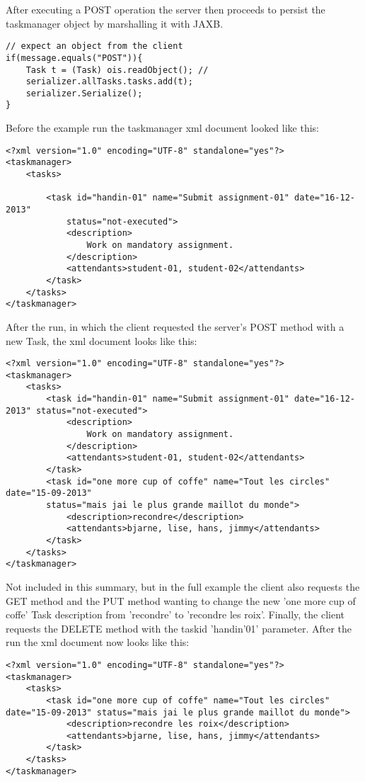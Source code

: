 After executing a POST operation the server then proceeds to persist the taskmanager object by marshalling it with JAXB.

\begin{lstlisting}[caption=server POST]
// expect an object from the client
if(message.equals("POST")){   
	Task t = (Task) ois.readObject(); // 
	serializer.allTasks.tasks.add(t);
    serializer.Serialize();	
}
\end{lstlisting}

Before the example run the taskmanager xml document looked like this:

\begin{lstlisting}[caption=xml before run]
<?xml version="1.0" encoding="UTF-8" standalone="yes"?>
<taskmanager>
	<tasks>
		
		<task id="handin-01" name="Submit assignment-01" date="16-12-2013"
			status="not-executed">
			<description>
				Work on mandatory assignment.
			</description>
			<attendants>student-01, student-02</attendants>
		</task>	
	</tasks>
</taskmanager>

\end{lstlisting}

After the run, in which the client requested the server's POST method with a new Task, the xml document looks like this:

\begin{lstlisting}[caption=xml after POST]
<?xml version="1.0" encoding="UTF-8" standalone="yes"?>
<taskmanager>
	<tasks>
		<task id="handin-01" name="Submit assignment-01" date="16-12-2013" status="not-executed">
			<description>
				Work on mandatory assignment.
			</description>
			<attendants>student-01, student-02</attendants>
		</task>
		<task id="one more cup of coffe" name="Tout les circles" date="15-09-2013" 
		status="mais jai le plus grande maillot du monde">
			<description>recondre</description>
			<attendants>bjarne, lise, hans, jimmy</attendants>
		</task>
	</tasks>
</taskmanager>
\end{lstlisting}

Not included in this summary, but in the full example the client also requests the GET method and the PUT method wanting to change the new 'one more cup of coffe' Task description from 'recondre' to 'recondre les roix'. Finally, the client requests the DELETE method with the taskid 'handin'01' parameter. After the run the xml document now looks like this:

\begin{lstlisting}[caption=xml after PUT]
<?xml version="1.0" encoding="UTF-8" standalone="yes"?>
<taskmanager>
	<tasks>
		<task id="one more cup of coffe" name="Tout les circles" date="15-09-2013" status="mais jai le plus grande maillot du monde">
			<description>recondre les roix</description>
			<attendants>bjarne, lise, hans, jimmy</attendants>
		</task>
	</tasks>
</taskmanager>
\end{lstlisting}

